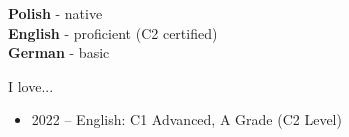 \documentclass[9pt]{developercv} %
\begin{document}

\begin{minipage}[t]{0.3\textwidth}
	\vspace{-\baselineskip} %

	
	\textbf{Polish} - native\\
	\textbf{English} - proficient (C2 certified)\\
	\textbf{German} - basic
\end{minipage}
\hfill
\begin{minipage}[t]{0.3\textwidth}
	\vspace{-\baselineskip} %
	
	
	I love... \lorem
\end{minipage}
\hfill
\begin{minipage}[t]{0.3\textwidth}
	\vspace{-\baselineskip} %
	
	\begin{itemize}
	    \item 2022 -- English: C1 Advanced, A Grade (C2 Level) 
	\end{itemize}
\end{minipage}

\end{document}
